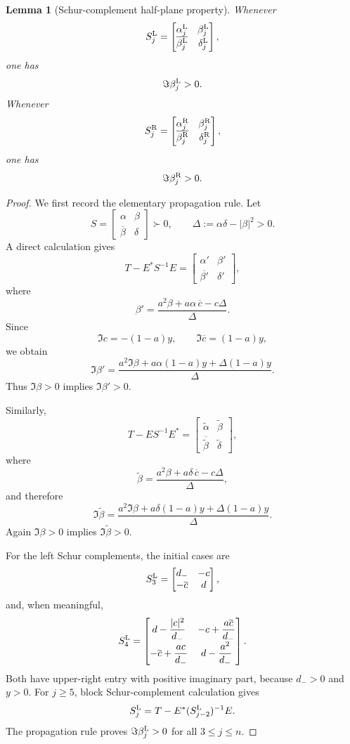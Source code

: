 \documentclass[11pt]{amsart}
\numberwithin{equation}{section}
\newtheorem{lemma}[theorem]{Lemma}
\begin{document}
\begin{lemma}[Schur-complement half-plane property]\label{lem:schur-half-plane}
Whenever
\[
S_j^{\rm L}
=
\begin{bmatrix}
\alpha_j^{\rm L} & \beta_j^{\rm L}\\
\overline{\beta_j^{\rm L}} & \delta_j^{\rm L}
\end{bmatrix},
\]
one has
\[
\Im\beta_j^{\rm L}>0.
\]
Whenever
\[
S_j^{\rm R}
=
\begin{bmatrix}
\alpha_j^{\rm R} & \beta_j^{\rm R}\\
\overline{\beta_j^{\rm R}} & \delta_j^{\rm R}
\end{bmatrix},
\]
one has
\[
\Im\beta_j^{\rm R}>0.
\]
\end{lemma}

\begin{proof}
We first record the elementary propagation rule.  Let
\[
S=
\begin{bmatrix}
\alpha & \beta\\
\overline\beta & \delta
\end{bmatrix}
\succ0,
\qquad
\Delta:=\alpha\delta-|\beta|^2>0.
\]
A direct calculation gives
\[
T-E^*S^{-1}E
=
\begin{bmatrix}
\alpha' & \beta'\\
\overline{\beta'} & \delta'
\end{bmatrix},
\]
where
\[
\beta'
=
\frac{a^2\beta+a\alpha\,\overline c-c\Delta}{\Delta}.
\]
Since
\[
\Im c=-(1-a)y,
\qquad
\Im\overline c=(1-a)y,
\]
we obtain
\[
\Im\beta'
=
\frac{
a^2\Im\beta+a\alpha(1-a)y+\Delta(1-a)y
}{\Delta}.
\]
Thus \(\Im\beta>0\) implies \(\Im\beta'>0\).

Similarly,
\[
T-ES^{-1}E^*
=
\begin{bmatrix}
\widetilde\alpha & \widetilde\beta\\
\overline{\widetilde\beta} & \widetilde\delta
\end{bmatrix},
\]
where
\[
\widetilde\beta
=
\frac{a^2\beta+a\delta\,\overline c-c\Delta}{\Delta},
\]
and therefore
\[
\Im\widetilde\beta
=
\frac{
a^2\Im\beta+a\delta(1-a)y+\Delta(1-a)y
}{\Delta}.
\]
Again \(\Im\beta>0\) implies \(\Im\widetilde\beta>0\).

For the left Schur complements, the initial cases are
\[
S_3^{\rm L}
=
\begin{bmatrix}
d_- & -c\\
-\overline c & d
\end{bmatrix},
\]
and, when meaningful,
\[
S_4^{\rm L}
=
\begin{bmatrix}
d-\dfrac{|c|^2}{d_-}
&
-c+\dfrac{a\overline c}{d_-}
\\[2mm]
-\overline c+\dfrac{ac}{d_-}
&
d-\dfrac{a^2}{d_-}
\end{bmatrix}.
\]
Both have upper-right entry with positive imaginary part, because \(d_->0\) and \(y>0\).  For \(j\ge5\), block Schur-complement calculation gives
\[
S_j^{\rm L}
=
T-E^*(S_{j-2}^{\rm L})^{-1}E.
\]
The propagation rule proves \(\Im\beta_j^{\rm L}>0\) for all \(3\le j\le n\).


\end{proof}
\end{document}
